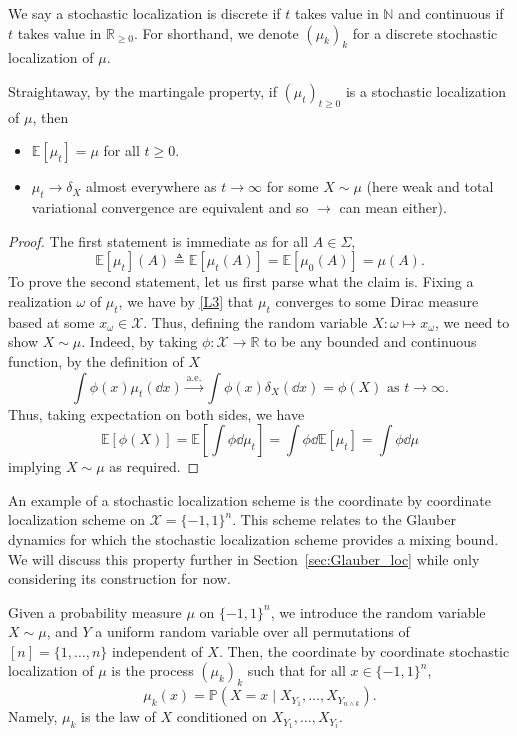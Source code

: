 We say a stochastic localization is discrete if \(t\) takes value in \(\mathbb{N}\) and continuous 
if \(t\) takes value in \(\mathbb{R}_{\ge 0}\). For shorthand, we denote \((\mu_k)_k\) for a
discrete stochastic localization of \(\mu\).

\begin{proposition}\label{prop:stoch_loc}
  Straightaway, by the martingale property, if \((\mu_t)_{t \ge 0}\) is a stochastic localization of \(\mu\), 
  then 
  \begin{itemize}
    \item \(\mathbb{E}[\mu_t] = \mu\) for all \(t \ge 0\).
    \item \(\mu_t \to \delta_X\) almost everywhere as \(t \to \infty\) for some \(X \sim \mu\)
      (here weak and total variational convergence are equivalent and so \(\to\) can mean either).
  \end{itemize}
\end{proposition}
\begin{proof}
  The first statement is immediate as for all \(A \in \Sigma\), 
  \[\mathbb{E}[\mu_t](A) \triangleq \mathbb{E}[\mu_t(A)] = \mathbb{E}[\mu_0(A)] = \mu(A).\]
  To prove the second statement, let us first parse what the claim is. Fixing a realization \(\omega\) of \(\mu_t\), 
  we have by \eqref{L3} that \(\mu_t\) converges to some Dirac measure based at some \(x_\omega \in \mathcal{X}\). Thus, 
  defining the random variable \(X : \omega \mapsto x_\omega\), we need to show \(X \sim \mu\). 
  Indeed, by taking \(\phi : \mathcal{X} \to \mathbb{R}\) to be any bounded and continuous function, by the 
  definition of \(X\)
  \[\int \phi(x) \mu_t(\dd x) \xrightarrow{\text{a.e.}} \int \phi(x) \delta_{X}(\dd x) = \phi(X) \text{ as } t \to \infty.\]
  Thus, taking expectation on both sides, we have 
  \[\mathbb{E}[\phi(X)] = \mathbb{E}\left[\int \phi \dd \mu_t\right] = 
    \int \phi \dd \mathbb{E}[\mu_t] = \int \phi \dd \mu\]
  implying \(X \sim \mu\) as required.
\end{proof}

An example of a stochastic localization scheme is the coordinate by coordinate localization scheme 
on \(\mathcal{X} = \{-1, 1\}^n\). This scheme relates to the Glauber dynamics for which the stochastic 
localization scheme provides a mixing bound. We will discuss this property further in Section~\ref{sec:Glauber_loc} while 
only considering its construction for now. 

Given a probability measure \(\mu\) on \(\{-1, 1\}^n\), we introduce the random variable \(X \sim \mu\), and 
\(Y\) a uniform random variable over all permutations of \([n] = \{1, \ldots, n\}\) independent of \(X\). 
Then, the coordinate by coordinate stochastic localization of \(\mu\) is the process \((\mu_k)_{k}\)
such that for all \(x \in \{-1, 1\}^n\),
\[\mu_k(x) = \mathbb{P}(X = x \mid X_{Y_1}, \ldots, X_{Y_{n \wedge k}}).\]
Namely, \(\mu_k\) is the law of \(X\) conditioned on \(X_{Y_1}, \ldots, X_{Y_i}\).

